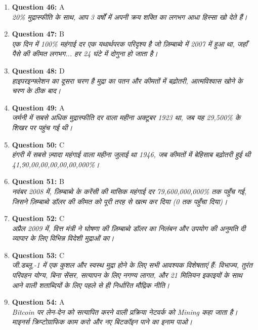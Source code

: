 \documentclass[12pt,a4paper]{article}
\begin{document}
\begin{enumerate}
\item \textbf{Question 46:} A
\\ \textit{20\% मुद्रास्फीति के साथ, आप 3 वर्षों में अपनी क्रय शक्ति का लगभग आधा हिस्सा खो देते हैं।}

\item \textbf{Question 47:} B
\\ \textit{एक दिन में 100\% महंगाई दर एक यथार्थपरक परिदृश्य है जो ज़िम्बाब्वे में 2007 में हुआ था, जहाँ पैसे की कीमत लगभग... हर 24 घंटे में दोगुना हो जाता है।}

\item \textbf{Question 48:} D
\\ \textit{हाइपरइन्फ्लेशन का दूसरा चरण है मुद्रा का पतन और कीमतों में बढ़ोतरी, आत्मविश्वास खोने के चरण के ठीक बाद।}

\item \textbf{Question 49:} A
\\ \textit{जर्मनी में सबसे अधिक मुद्रास्फीति दर वाला महीना अक्टूबर 1923 था, जब यह 29,500\% के शिखर पर पहुंच गई थी।}

\item \textbf{Question 50:} C
\\ \textit{हंगरी में सबसे ज़्यादा महंगाई वाला महीना जुलाई था 1946, जब कीमतों में बेहिसाब बढ़ोतरी हुई थी 41,90,00,00,00,00,00,000\%।}

\item \textbf{Question 51:} B
\\ \textit{नवंबर 2008 में, ज़िम्बाब्वे के करेंसी की मासिक महंगाई दर 79,600,000,000\% तक पहुँच गई, जिसने ज़िम्बाब्वे डॉलर की कीमत को पूरी तरह से खत्म कर दिया (0 तक पहुँचा दिया)।}

\item \textbf{Question 52:} C
\\ \textit{अप्रैल 2009 में, वित्त मंत्री ने घोषणा की ज़िम्बाब्वे डॉलर का निलंबन और उपयोग की अनुमति दी व्यापार के लिए विभिन्न विदेशी मुद्राओं का।}

\item \textbf{Question 53:} C
\\ \textit{जी.डब्लू.-1 में एक कुशल और स्वस्थ मुद्रा होने के लिए सभी आवश्यक विशेषताएं हैं: विभाज्य, तुरंत परिवहन योग्य, बिना सेंसर, सत्यापन के लिए नगण्य लागत, और 21 मिलियन इकाइयों के साथ आने वाली शताब्दियों के लिए पहले से ही निर्धारित मौद्रिक नीति।}

\item \textbf{Question 54:} A
\\ \textit{Bitcoin पर लेन-देन को सत्यापित करने वाली प्रक्रिया नेटवर्क को Mining कहा जाता है। माइनर्स क्रिप्टोग्राफिक काम करो और नए बिटकॉइन पाने का इनाम पाओ।}


\end{enumerate}
\end{document}
